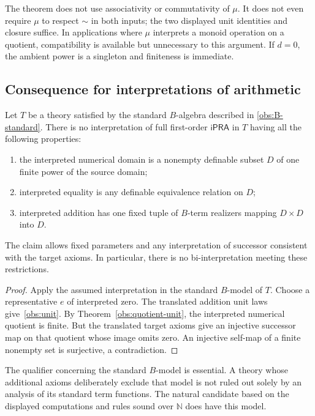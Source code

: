 \begin{remark}
The theorem does not use associativity or commutativity of $\mu$.
It does not even require $\mu$ to respect $\sim$ in both inputs; the
two displayed unit identities and closure suffice. In applications
where $\mu$ interprets a monoid operation on a quotient, compatibility
is available but unnecessary to this argument. If $d=0$, the ambient
power is a singleton and finiteness is immediate.
\end{remark}

\subsection{Consequence for interpretations of arithmetic}

\begin{corollary}
\label{obs:no-ipra-term-interpretation}
Let $T$ be a theory satisfied by the standard $B$-algebra described in
\eqref{obs:B-standard}. There is no interpretation of full first-order
$\mathsf{iPRA}$ in $T$ having all the following properties:
\begin{enumerate}
\item the interpreted numerical domain is a nonempty definable subset
      $D$ of one finite power of the source domain;
\item interpreted equality is any definable equivalence relation on $D$;
\item interpreted addition has one fixed tuple of $B$-term realizers
      mapping $D\times D$ into $D$.
\end{enumerate}
The claim allows fixed parameters and any interpretation of successor
consistent with the target axioms. In particular, there is no
bi-interpretation meeting these restrictions.
\end{corollary}

\begin{proof}
Apply the assumed interpretation in the standard $B$-model of $T$.
Choose a representative $e$ of interpreted zero. The translated
addition unit laws give~\eqref{obs:unit}. By
Theorem~\ref{obs:quotient-unit}, the interpreted numerical quotient is
finite. But the translated target axioms give an injective successor
map on that quotient whose image omits zero. An injective self-map of a
finite nonempty set is surjective, a contradiction.
\end{proof}

The qualifier concerning the standard $B$-model is essential. A theory
whose additional axioms deliberately exclude that model is not ruled
out solely by an analysis of its standard term functions. The natural
candidate based on the displayed computations and rules sound over
$\mathbb N$ does have this model.

